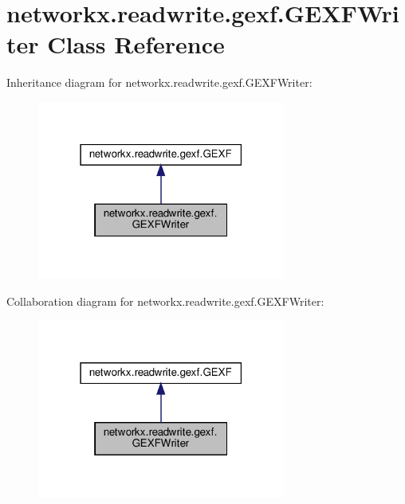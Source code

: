 \hypertarget{classnetworkx_1_1readwrite_1_1gexf_1_1GEXFWriter}{}\section{networkx.\+readwrite.\+gexf.\+G\+E\+X\+F\+Writer Class Reference}
\label{classnetworkx_1_1readwrite_1_1gexf_1_1GEXFWriter}


Inheritance diagram for networkx.\+readwrite.\+gexf.\+G\+E\+X\+F\+Writer\+:
\nopagebreak
\begin{figure}[H]
\begin{center}
\leavevmode
\includegraphics[width=231pt]{classnetworkx_1_1readwrite_1_1gexf_1_1GEXFWriter__inherit__graph}
\end{center}
\end{figure}


Collaboration diagram for networkx.\+readwrite.\+gexf.\+G\+E\+X\+F\+Writer\+:
\nopagebreak
\begin{figure}[H]
\begin{center}
\leavevmode
\includegraphics[width=231pt]{classnetworkx_1_1readwrite_1_1gexf_1_1GEXFWriter__coll__graph}
\end{center}
\end{figure}

